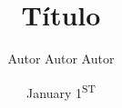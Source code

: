 \documentclass{ASD_LaTeX}
\author{Autor Autor Autor}
\title{Título}
\date{January 1\textsuperscript{ST}}
\begin{document}
    
    \biblio
    
\end{document}
